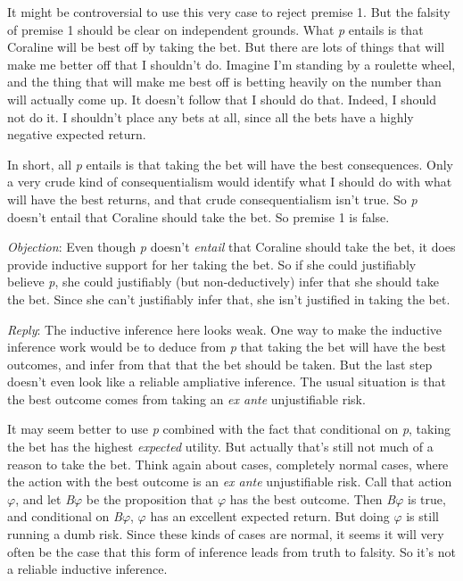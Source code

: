 \documentclass[
  10pt,
  letterpaper,
  DIV=11,
  numbers=noendperiod,
  twoside]{scrartcl}
\begin{document}
It might be controversial to use this very case to reject premise 1. But
the falsity of premise 1 should be clear on independent grounds. What
\emph{p} entails is that Coraline will be best off by taking the bet.
But there are lots of things that will make me better off that I
shouldn't do. Imagine I'm standing by a roulette wheel, and the thing
that will make me best off is betting heavily on the number than will
actually come up. It doesn't follow that I should do that. Indeed, I
should not do it. I shouldn't place any bets at all, since all the bets
have a highly negative expected return.

In short, all \emph{p} entails is that taking the bet will have the best
consequences. Only a very crude kind of consequentialism would identify
what I should do with what will have the best returns, and that crude
consequentialism isn't true. So \emph{p} doesn't entail that Coraline
should take the bet. So premise 1 is false.

\emph{Objection}: Even though \emph{p} doesn't \emph{entail} that
Coraline should take the bet, it does provide inductive support for her
taking the bet. So if she could justifiably believe \emph{p}, she could
justifiably (but non-deductively) infer that she should take the bet.
Since she can't justifiably infer that, she isn't justified in taking
the bet.

\emph{Reply}: The inductive inference here looks weak. One way to make
the inductive inference work would be to deduce from \emph{p} that
taking the bet will have the best outcomes, and infer from that that the
bet should be taken. But the last step doesn't even look like a reliable
ampliative inference. The usual situation is that the best outcome comes
from taking an \emph{ex ante} unjustifiable risk.

It may seem better to use \emph{p} combined with the fact that
conditional on \emph{p}, taking the bet has the highest \emph{expected}
utility. But actually that's still not much of a reason to take the bet.
Think again about cases, completely normal cases, where the action with
the best outcome is an \emph{ex ante} unjustifiable risk. Call that
action \(\varphi\), and let \emph{B}\(\varphi\) be the proposition that
\(\varphi\) has the best outcome. Then \emph{B}\(\varphi\) is true, and
conditional on \emph{B}\(\varphi\), \(\varphi\) has an excellent
expected return. But doing \(\varphi\) is still running a dumb risk.
Since these kinds of cases are normal, it seems it will very often be
the case that this form of inference leads from truth to falsity. So
it's not a reliable inductive inference.
\end{document}
